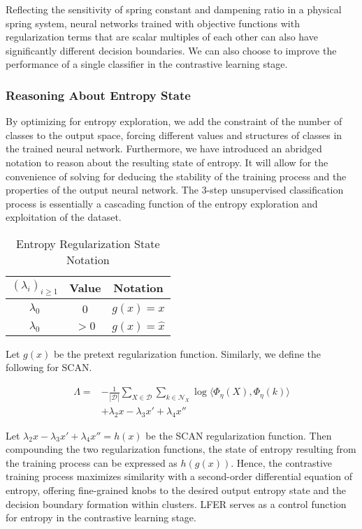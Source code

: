 \documentclass[journal]{journal}
\begin{document}
Reflecting the sensitivity of spring constant and dampening ratio in a physical spring system, neural networks trained with objective functions with regularization terms that are scalar multiples of each other can also have significantly different decision boundaries. We can also choose to improve the performance of a single classifier in the contrastive learning stage.


\subsubsection{Reasoning About Entropy State}
 By optimizing for entropy exploration, we add the constraint of the number of classes to the output space, forcing different values and structures of classes in the trained neural network. Furthermore, we have introduced an abridged notation to reason about the resulting state of entropy. It will allow for the convenience of solving for deducing the stability of the training process and the properties of the output neural network. The 3-step unsupervised classification process is essentially a cascading function of the entropy exploration and exploitation of the dataset. 

\begin{table}[h]
\centering

\label{tab:tabela1}
\begin{tabular}{|c|c|c|}
\hline
$(\lambda_{i})_{i \geq 1} $ & Value & Notation \\ \hline
$\lambda_{0}$ & 0 & $g(x) = x$ \\
$\lambda_{0}$ & $>0$ & $g(x) = \hat{x}$ \\
\hline
\end{tabular}
\caption{Entropy Regularization State Notation}
\end{table}

Let $g(x)$ be the pretext regularization function. Similarly, we define the following for SCAN. 

\begin{equation}
\begin{aligned}
    \Lambda =   & -\frac{1}{|\mathcal{D}|} \sum_{X \in \mathcal{D}} \sum_{k \in \mathcal{N}_X} \log \langle \Phi_{\eta}(X), \Phi_{\eta}(k) \rangle \\ & + \lambda_{2} x - \lambda_{3}x' + \lambda_{4}x''
\end{aligned}
\end{equation}

Let $\lambda_{2} x - \lambda_{3}x' + \lambda_{4}x'' = h(x) $ be the SCAN regularization function. Then compounding the two regularization functions, the state of entropy resulting from the training process can be expressed as $h(g(x))$. Hence, the contrastive training process maximizes similarity with a second-order differential equation of entropy, offering fine-grained knobs to the desired output entropy state and the decision boundary formation within clusters. LFER serves as a control function for entropy in the contrastive learning stage. 
\end{document}
